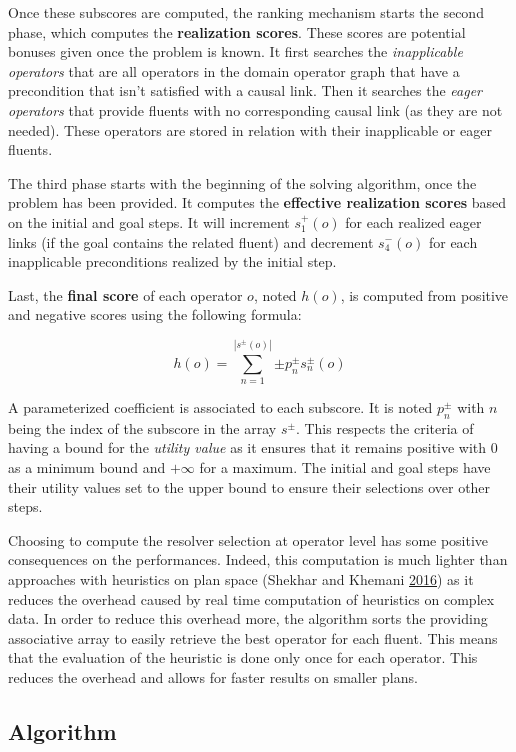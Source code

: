 \documentclass[11pt,a4paper,twoside,openright,titlepage,numbers=noenddot,headinclude,cleardoublepage=empty,openany]{scrreprt}
\theoremstyle{plain}
\theoremstyle{definition}
\theoremstyle{remark}
\begin{document}
Once these subscores are computed, the ranking mechanism starts the
second phase, which computes the \textbf{realization scores}. These
scores are potential bonuses given once the problem is known. It first
searches the \emph{inapplicable operators} that are all operators in the
domain operator graph that have a precondition that isn't satisfied with
a causal link. Then it searches the \emph{eager operators} that provide
fluents with no corresponding causal link (as they are not needed).
These operators are stored in relation with their inapplicable or eager
fluents.

The third phase starts with the beginning of the solving algorithm, once
the problem has been provided. It computes the \textbf{effective
realization scores} based on the initial and goal steps. It will
increment \(s_1^+(o)\) for each realized eager links (if the goal
contains the related fluent) and decrement \(s_4^-(o)\) for each
inapplicable preconditions realized by the initial step.

Last, the \textbf{final score} of each operator \(o\), noted \(h(o)\),
is computed from positive and negative scores using the following
formula:

\[h(o) = \sum_{n=1}^{|s^\pm(o)|}{\pm p_n^\pm s^\pm_n(o)}\]

A parameterized coefficient is associated to each subscore. It is noted
\(p_n^\pm\) with \(n\) being the index of the subscore in the array
\(s^\pm\). This respects the criteria of having a bound for the
\emph{utility value} as it ensures that it remains positive with \(0\)
as a minimum bound and \(+\infty\) for a maximum. The initial and goal
steps have their utility values set to the upper bound to ensure their
selections over other steps.

Choosing to compute the resolver selection at operator level has some
positive consequences on the performances. Indeed, this computation is
much lighter than approaches with heuristics on plan space (Shekhar and
Khemani \protect\hyperlink{ref-shekhar_learning_2016}{2016}) as it
reduces the overhead caused by real time computation of heuristics on
complex data. In order to reduce this overhead more, the algorithm sorts
the providing associative array to easily retrieve the best operator for
each fluent. This means that the evaluation of the heuristic is done
only once for each operator. This reduces the overhead and allows for
faster results on smaller plans.

\hypertarget{algorithm}{%
\subsection{Algorithm}\label{algorithm}}
\end{document}
